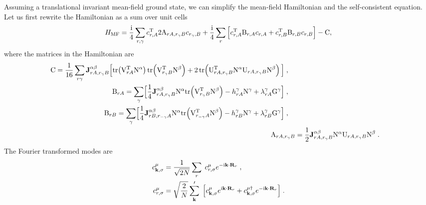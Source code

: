 Assuming a translational invariant mean-field ground state, we can simplify the mean-field Hamiltonian and the self-consistent equation.
Let us first rewrite the Hamiltonian as a sum over unit cells
\begin{equation}
    H_{\mathrm{MF}}=
    \frac{\mathrm{i}}{4} \sum_{r,\gamma}   c_{r,A}^{{\mathrm{T}}}  2 \mathrm{A}_{rA,r_\gamma B}  c_{r_\gamma,B} +
    \frac{\mathrm{i}}{4}  \sum_{r}\Big[ c_{r,A}^{{\mathrm{T}}}\mathrm{B}_{r,A}c_{r,A}+c_{r,B}^{{\mathrm{T}}}\mathrm{B}_{r,B}c_{r,B}\Big] -
    \mathrm{C} ,
\end{equation}
where the matrices in the Hamiltonian are
\begin{align}
\begin{split}
    \mathrm{C}&=\frac{1}{16}\sum_{r\gamma }   \mathbf{J}_{rA,r_{\gamma} B}^{\alpha\beta} \Big[
     \mathrm{tr}\!\left( \mathrm{V}_{rA}^{\mathrm{T}} \mathrm{N}^\alpha \right)\mathrm{tr}\!\left( \mathrm{V}_{r_\gamma B}^{\mathrm{T}} \mathrm{N}^\beta \right)
    + 2 \,  \mathrm{tr}\!\left( \mathrm{U}_{rA,r_\gamma B}^{\mathrm{T}} \mathrm{N}^\alpha   \mathrm{U}_{rA,r_\gamma B} \mathrm{N}^\beta \right)   \Big]
    \; ,
\end{split}    \\
\begin{split}
    \mathrm{B}_{rA}&= \sum_{\gamma}\!\Big[  \frac{1}{4}  \mathbf{J}_{rA,r_{\gamma} B}^{\alpha\beta}
    \mathrm{N}^\alpha \mathrm{tr}\!\left( \mathrm{V}_{r_{\gamma} B}^{\mathrm{T}} \mathrm{N}^\beta \right) -    h_{rA}^\gamma  \mathrm{N}^\gamma  + \lambda_{rA}^\gamma  \mathrm{G}^\gamma \Big]
    \; ,
\end{split} \\
\begin{split}
    \mathrm{B}_{rB}&= \sum_{\gamma}\!\Big[  \frac{1}{4} \mathbf{J}_{rB,r_{-\gamma} A}^{\alpha\beta}
    \mathrm{N}^\alpha \mathrm{tr}\!\left( \mathrm{V}_{r_{-\gamma} A}^{\mathrm{T}} \mathrm{N}^\beta \right) -    h_{rB}^\gamma  \mathrm{N}^\gamma  + \lambda_{rB}^\gamma  \mathrm{G}^\gamma \Big]
    \; ,
\end{split} \\
\mathrm{A}_{rA,r_\gamma B} &= \frac{1}{2} \mathbf{J}_{rA,r_{\gamma} B}^{\alpha\beta}   \mathrm{N}^\alpha \mathrm{U}_{rA,r_{\gamma} B} \mathrm{N}^\beta \; .
\end{align}
The Fourier transformed modes are
\begin{align}
    c_{\mathbf{k},\sigma}^\mu &= \frac{1}{\sqrt{2N}} \sum_{r} \; c_{r,\sigma}^\mu e^{-\im \mathbf{k}\cdot\mathbf{R}_r} \; , \\
    c_{r,\sigma}^\mu &= \sqrt{\frac{2}{N}} \sum_{\mathbf{k}}^{\prime}  \; \Big[
    c_{\mathbf{k},\sigma}^{\mu\pd\!} e^{\im \mathbf{k}\cdot\mathbf{R}_r}+c_{\mathbf{k},\sigma}^{\mu\dagger} e^{-\im \mathbf{k}\cdot\mathbf{R}_r}
    \Big]\; .
\end{align}
